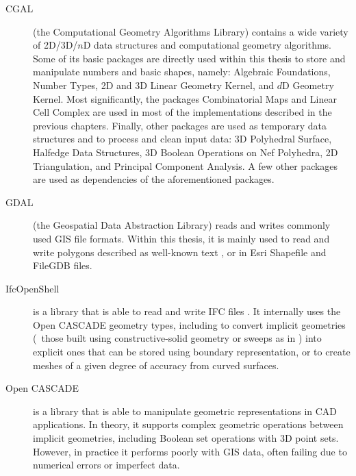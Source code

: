 \begin{description}

\item[CGAL\footnotemark]
(the Computational Geometry Algorithms Library) contains a wide variety of 2D/3D/$n$D data structures and computational geometry algorithms.
Some of its basic packages are directly used within this thesis to store and manipulate numbers and basic shapes, namely: Algebraic Foundations, Number Types, 2D and 3D Linear Geometry Kernel, and $d$D Geometry Kernel.
Most significantly, the packages Combinatorial Maps and Linear Cell Complex are used in most of the implementations described in the previous chapters.
Finally, other packages are used as temporary data structures and to process and clean input data: 3D Polyhedral Surface, Halfedge Data Structures, 3D Boolean Operations on Nef Polyhedra, 2D Triangulation, and Principal Component Analysis.
A few other packages are used as dependencies of the aforementioned packages.

\item[GDAL\footnotemark]
(the Geospatial Data Abstraction Library) reads and writes commonly used GIS file formats.
Within this thesis, it is mainly used to read and write polygons described as well-known text \citep{SimpleFeatures1}, or in Esri Shapefile \citep{Shapefile} and FileGDB files.

\item[IfcOpenShell\footnotemark]
is a library that is able to read and write IFC files \citep{ISO16739:2013}.
It internally uses the Open CASCADE geometry types, including to convert implicit geometries (\eg\ those built using constructive-solid geometry or sweeps as in ) into explicit ones that can be stored using boundary representation, or to create meshes of a given degree of accuracy from curved surfaces.

\item[Open CASCADE\footnotemark]
is a library that is able to manipulate geometric representations in CAD applications.
In theory, it supports complex geometric operations between implicit geometries, including Boolean set operations with 3D point sets.
However, in practice it performs poorly with GIS data, often failing due to numerical errors or imperfect data.

\end{description}

